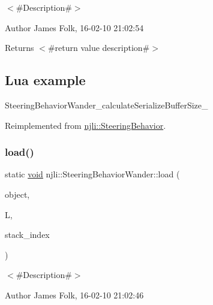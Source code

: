 $<$\#\+Description\#$>$ 

\begin{DoxyAuthor}{Author}
James Folk, 16-\/02-\/10 21\+:02\+:54
\end{DoxyAuthor}
\begin{DoxyReturn}{Returns}
$<$\#return value description\#$>$
\end{DoxyReturn}
\hypertarget{classnjli_1_1_steering_behavior_wander_ex1}{}\subsection{Lua example}\label{classnjli_1_1_steering_behavior_wander_ex1}

\begin{DoxyCodeInclude}
\end{DoxyCodeInclude}
Steering\+Behavior\+Wander\+\_\+calculate\+Serialize\+Buffer\+Size\+\_\+ 

Reimplemented from \mbox{\hyperlink{classnjli_1_1_steering_behavior_ae82bca8468d41aff8c22b76fd359fe9b}{njli\+::\+Steering\+Behavior}}.

\mbox{\label{classnjli_1_1_steering_behavior_wander_a9e92e32839672b023087658f6ee9c703}} 
\subsubsection{\texorpdfstring{load()}{load()}}
{\footnotesize\ttfamily static \mbox{\hyperlink{_thread_8h_af1e856da2e658414cb2456cb6f7ebc66}{void}} njli\+::\+Steering\+Behavior\+Wander\+::load (\begin{DoxyParamCaption}\item[{\mbox{\hyperlink{classnjli_1_1_steering_behavior_wander}{Steering\+Behavior\+Wander}} \&}]{object,  }\item[{lua\+\_\+\+State $\ast$}]{L,  }\item[{int}]{stack\+\_\+index }\end{DoxyParamCaption})\hspace{0.3cm}{\ttfamily [static]}}



$<$\#\+Description\#$>$ 

\begin{DoxyAuthor}{Author}
James Folk, 16-\/02-\/10 21\+:02\+:46
\end{DoxyAuthor}

